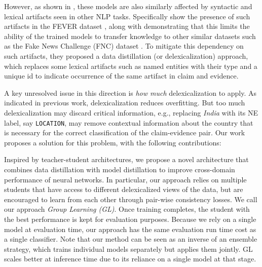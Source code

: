 However, as shown in \citep{panenghat2020towards, karimi-mahabadi-etal-2020-end, gururangan-etal-2018-annotation}, these models are also similarly affected by syntactic and lexical artifacts seen in other NLP tasks. Specifically \citep{suntwal-etal-2019-importance} show the presence of such artifacts in the FEVER dataset \citep{thorne-etal-2018-fact}, along with demonstrating that this limits the ability of the trained models to transfer knowledge to other similar datasets such as the Fake News Challenge (FNC) dataset \citep{pomerleau2017fake}. To mitigate this dependency on such artifacts, they proposed a data distillation (or delexicalization) approach, which replaces some lexical artifacts such as named entities with their type and a unique id to indicate occurrence of the same artifact in claim and evidence. %

A key unresolved issue in this direction is {\em how much} delexicalization to apply. As indicated in previous work, delexicalization reduces overfitting. But too much delexicalization may discard critical information, e.g., replacing {\em India} with its NE label, say {\tt LOCATION}, may remove contextual information about the country that is necessary for the correct classification of the claim-evidence pair. Our work proposes a solution for this problem, with the following contributions:





{} Inspired by teacher-student architectures, we propose a novel architecture that combines data distillation with model distillation to improve cross-domain performance of neural networks. In particular, our approach relies on multiple students that have access to different delexicalized views of the data, but are encouraged to learn from each other through pair-wise consistency losses. We call our approach \emph{Group Learning (GL)}. Once training completes, the student with the best performance is kept for evaluation purposes. Because we rely on a single model at evaluation time, our approach has the same evaluation run time cost as a single classifier. Note that our method can be seen as an inverse of an ensemble strategy, which trains individual models separately but applies them jointly. GL scales better at inference time due to its reliance on a single model at that stage.

